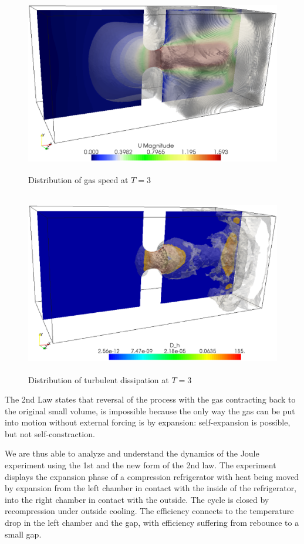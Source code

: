 \begin{figure}[bhpt] 
\centerline{ 
\includegraphics[height=8.0cm]
{chapters/hoffman-3/eps/vel_T_3.eps}
} 
\caption{Distribution of gas speed at $T=3$}
\label{vel3} 
\end{figure}

\begin{figure}[bhpt] 
\centerline{ 
\includegraphics[height=8.0cm]
{chapters/hoffman-3/eps/tur_disp.eps}
} 
\caption{Distribution of turbulent dissipation at $T=3$}
\label{tur_disp_dist} 
\end{figure}


The 2nd Law states that reversal of 
the process with the gas contracting back to the original small volume,
is impossible because the only way the gas can be put into motion without
external forcing is 
by expansion: self-expansion is possible, but not self-constraction. 

We are thus able to analyze and understand the dynamics of the Joule experiment
using the 1st and
the new form of the 2nd law. The experiment displays the expansion phase of a
compression refrigerator
with heat being moved by expansion from the left chamber in contact with the
inside of the refrigerator, 
into the right chamber in contact with the outside. The cycle is closed by
recompression under outside cooling. 
The efficiency connects to the temperature drop in the left chamber and the gap,
with efficiency suffering from
rebounce to a small gap.   

